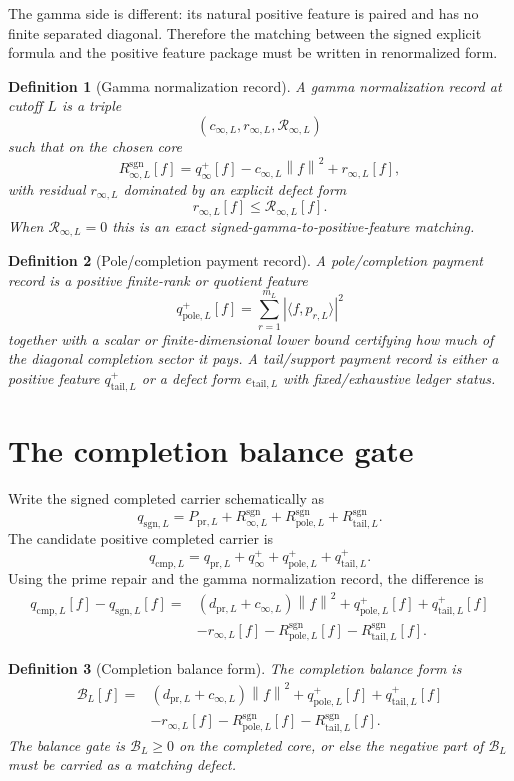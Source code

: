 \documentclass[11pt]{article}
\newtheorem{definition}{Definition}
\newcommand{\ip}[2]{\langle #1,#2\rangle}
\newcommand{\norm}[1]{\left\lVert #1\right\rVert}
\newcommand{\sgn}{\mathrm{sgn}}
\newcommand{\cmp}{\mathrm{cmp}}
\newcommand{\pr}{\mathrm{pr}}
\newcommand{\tail}{\mathrm{tail}}
\newcommand{\pole}{\mathrm{pole}}
\begin{document}
The gamma side is different: its natural positive feature is paired and has no finite separated diagonal. Therefore the matching between the signed explicit formula and the positive feature package must be written in renormalized form.

\begin{definition}[Gamma normalization record]
A gamma normalization record at cutoff $L$ is a triple
\[
  (c_{\infty,L},r_{\infty,L},\mathcal R_{\infty,L})
\]
such that on the chosen core
\[
  R_{\infty,L}^{\sgn}[f]
  =q_\infty^+[f]-c_{\infty,L}\norm f^2+r_{\infty,L}[f],
\]
with residual $r_{\infty,L}$ dominated by an explicit defect form
\[
  r_{\infty,L}[f]\le \mathcal R_{\infty,L}[f].
\]
When $\mathcal R_{\infty,L}=0$ this is an exact signed-gamma-to-positive-feature matching.
\end{definition}

\begin{definition}[Pole/completion payment record]
A pole/completion payment record is a positive finite-rank or quotient feature
\[
  q_{\pole,L}^+[f]=\sum_{r=1}^{m_L}|\ip{f}{p_{r,L}}|^2
\]
together with a scalar or finite-dimensional lower bound certifying how much of the diagonal completion sector it pays. A tail/support payment record is either a positive feature $q_{\tail,L}^+$ or a defect form $e_{\tail,L}$ with fixed/exhaustive ledger status.
\end{definition}

\section{The completion balance gate}
Write the signed completed carrier schematically as
\[
  q_{\sgn,L}=P_{\pr,L}+R_{\infty,L}^{\sgn}+R_{\pole,L}^{\sgn}+R_{\tail,L}^{\sgn}.
\]
The candidate positive completed carrier is
\[
  q_{\cmp,L}=q_{\pr,L}+q_\infty^++q_{\pole,L}^++q_{\tail,L}^+.
\]
Using the prime repair and the gamma normalization record, the difference is
\[
\begin{aligned}
  q_{\cmp,L}[f]-q_{\sgn,L}[f]
  ={}& (d_{\pr,L}+c_{\infty,L})\norm f^2
  +q_{\pole,L}^+[f]+q_{\tail,L}^+[f]
  \\
  &-r_{\infty,L}[f]-R_{\pole,L}^{\sgn}[f]-R_{\tail,L}^{\sgn}[f].
\end{aligned}
\]

\begin{definition}[Completion balance form]
The completion balance form is
\[
\boxed{
\begin{aligned}
  \mathcal B_L[f]
  ={}& (d_{\pr,L}+c_{\infty,L})\norm f^2
  +q_{\pole,L}^+[f]+q_{\tail,L}^+[f]
  \\
  &-r_{\infty,L}[f]-R_{\pole,L}^{\sgn}[f]-R_{\tail,L}^{\sgn}[f].
\end{aligned}}
\]
The balance gate is $\mathcal B_L\ge0$ on the completed core, or else the negative part of $\mathcal B_L$ must be carried as a matching defect.
\end{definition}
\end{document}
